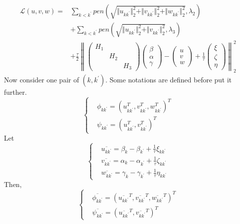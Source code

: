 \documentclass[12pt, a4paper, oneside]{article}
\numberwithin{equation}{section}
\begin{document}
\begin{equation}
\begin{aligned}
\mathcal{L}(u,v,w)=& \sum_{k<{k^\prime}}pen(\sqrt{\Vert u_{k{k^\prime}}\Vert_2^2 + \Vert v_{k{k^\prime}}\Vert_2^2 + \Vert w_{k{k^\prime}}\Vert_2^2}, \lambda_2) \\
&+ \sum_{k<{k^\prime}}pen(\sqrt{\Vert u_{k{k^\prime}}\Vert_2^2 + \Vert v_{k{k^\prime}}\Vert_2^2}, \lambda_3) \\
&+ \frac{\tau}{2}\left\|\left(\begin{array}{ccc}
	H_{1} & & \\
	& H_{2} & \\
	& & H_{3}
\end{array}\right)\left(\begin{array}{l}
	\beta \\
	\alpha \\
	\gamma
\end{array}\right)-\left(\begin{array}{l}
	u \\
	v \\
	w
\end{array}\right)+\frac{1}{\tau}\left(\begin{array}{l}
	\xi \\
	\zeta \\
	\eta
\end{array}\right)\right\|_{2}^{2}
\end{aligned}
\end{equation}
Now consider one pair of $(k, k^\prime)$. Some notations are defined before put it further.
\begin{equation}
\label{eq:update-uvw-ori}
\left\{
\begin{aligned}
&\phi_{k{k^\prime}} = (u^T_{k{k^\prime}}, v^T_{k{k^\prime}}, w^T_{k{k^\prime}})^T \\
&\psi_{k{k^\prime}} = (u^T_{k{k^\prime}}, v^T_{k{k^\prime}})^T
\end{aligned}
\right.
\end{equation}
Let
\begin{equation}
	\left\{
	\begin{aligned}
		&\overline{u_{k{k^\prime}}} = \beta_k - \beta_{k^\prime} + \frac{1}{\tau}\xi_{k{k^\prime}}\\
		&\overline{v_{k{k^\prime}}} = \alpha_k - \alpha_{k^\prime} + \frac{1}{\tau}\zeta_{k{k^\prime}}\\
		&\overline{w_{k{k^\prime}}} = \gamma_k - \gamma_{k^\prime} + \frac{1}{\tau}\eta_{k{k^\prime}}
	\end{aligned}
	\right.
\end{equation}
Then, 
\begin{equation}
	\left\{
	\begin{aligned}
		&\overline{\phi_{k{k^\prime}}} = (\overline{u_{k{k^\prime}}}^T, \overline{v_{k{k^\prime}}}^T, \overline{w_{k{k^\prime}}}^T)^T \\
		&\overline{\psi_{k{k^\prime}}} = (\overline{u_{k{k^\prime}}}^T, \overline{v_{k{k^\prime}}}^T)^T
	\end{aligned}
	\right.
\end{equation}
\end{document}
